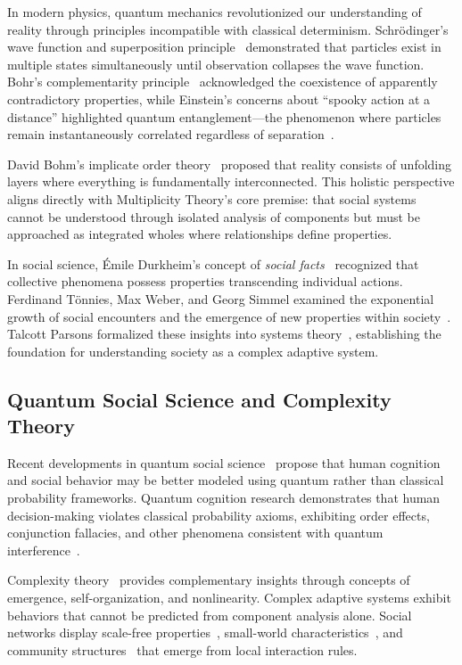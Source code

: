 \documentclass[11pt,a4paper]{article}
\begin{document}
In modern physics, quantum mechanics revolutionized our understanding of reality through principles incompatible with classical determinism. Schrödinger's wave function and superposition principle~\cite{schrodinger1935} demonstrated that particles exist in multiple states simultaneously until observation collapses the wave function. Bohr's complementarity principle~\cite{bohr1928} acknowledged the coexistence of apparently contradictory properties, while Einstein's concerns about ``spooky action at a distance'' highlighted quantum entanglement—the phenomenon where particles remain instantaneously correlated regardless of separation~\cite{einstein1935}.

David Bohm's implicate order theory~\cite{bohm1980} proposed that reality consists of unfolding layers where everything is fundamentally interconnected. This holistic perspective aligns directly with Multiplicity Theory's core premise: that social systems cannot be understood through isolated analysis of components but must be approached as integrated wholes where relationships define properties.

In social science, Émile Durkheim's concept of \textit{social facts}~\cite{durkheim1895} recognized that collective phenomena possess properties transcending individual actions. Ferdinand Tönnies, Max Weber, and Georg Simmel examined the exponential growth of social encounters and the emergence of new properties within society~\cite{tonnies1887,weber1922,simmel1908}. Talcott Parsons formalized these insights into systems theory~\cite{parsons1951}, establishing the foundation for understanding society as a complex adaptive system.

\subsection{Quantum Social Science and Complexity Theory}

Recent developments in quantum social science~\cite{haven2013,wendt2015} propose that human cognition and social behavior may be better modeled using quantum rather than classical probability frameworks. Quantum cognition research demonstrates that human decision-making violates classical probability axioms, exhibiting order effects, conjunction fallacies, and other phenomena consistent with quantum interference~\cite{busemeyer2012}.

Complexity theory~\cite{mitchell2009} provides complementary insights through concepts of emergence, self-organization, and nonlinearity. Complex adaptive systems exhibit behaviors that cannot be predicted from component analysis alone. Social networks display scale-free properties~\cite{barabasi1999}, small-world characteristics~\cite{watts1998}, and community structures~\cite{girvan2002} that emerge from local interaction rules.
\end{document}
